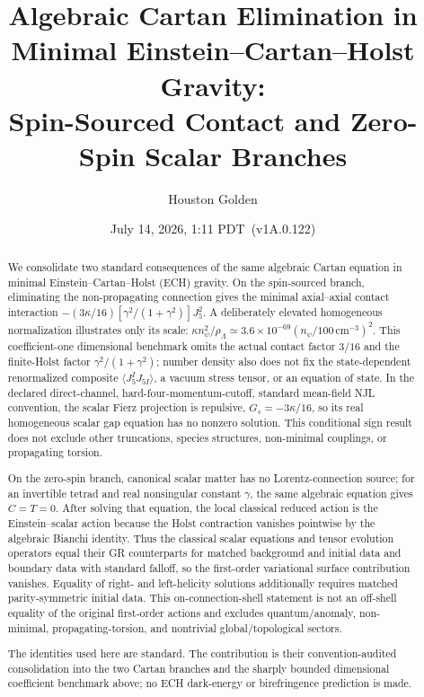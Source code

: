 \documentclass[aps,prd,twocolumn,superscriptaddress,preprintnumbers,nofootinbib,longbibliography,floatfix]{revtex4-2}
\newcommand{\paperVersion}{v1A.0.122}
\newcommand{\paperTimestamp}{July 14, 2026, 1:11 PDT}
\begin{document}

\title{Algebraic Cartan Elimination in Minimal Einstein--Cartan--Holst Gravity:\\
Spin-Sourced Contact and Zero-Spin Scalar Branches}

\author{Houston Golden}

\date{\paperTimestamp\ (\paperVersion)}

\begin{abstract}
We consolidate two standard consequences of the same algebraic Cartan
equation in minimal Einstein--Cartan--Holst (ECH) gravity.  On the
spin-sourced branch, eliminating the non-propagating connection gives the
minimal axial--axial contact interaction
$-(3\kappa/16)[\gamma^2/(1+\gamma^2)]J_5^2$.  A deliberately elevated
homogeneous normalization illustrates only its scale:
$\kappa n_\psi^2/\rho_\Lambda\simeq
3.6\times10^{-69}(n_\psi/100\,\mathrm{cm}^{-3})^2$.
This coefficient-one dimensional benchmark omits the actual contact factor
$3/16$ and the finite-Holst factor $\gamma^2/(1+\gamma^2)$; number density
also does not fix the state-dependent renormalized composite
$\langle J_5^I J_{5I}\rangle$, a vacuum stress tensor, or an equation of
state.  In the declared direct-channel, hard-four-momentum-cutoff, standard
mean-field NJL convention, the scalar Fierz projection is repulsive,
$G_s=-3\kappa/16$, so its real homogeneous scalar gap equation has no nonzero
solution.  This conditional sign result does not exclude other truncations,
species structures, non-minimal couplings, or propagating torsion.

On the zero-spin branch, canonical scalar matter has no Lorentz-connection
source; for an invertible tetrad and real nonsingular constant $\gamma$, the
same algebraic equation gives $C=T=0$.  After solving that equation, the local
classical reduced action is the Einstein--scalar action because the Holst
contraction vanishes pointwise by the algebraic Bianchi identity.  Thus the
classical scalar equations and tensor evolution operators equal their GR
counterparts for matched background and initial data and boundary data with
standard falloff, so the first-order variational surface contribution
vanishes.  Equality of right- and left-helicity solutions additionally
requires matched parity-symmetric initial data.  This on-connection-shell
statement is not an off-shell equality
of the original first-order actions and excludes quantum/anomaly,
non-minimal, propagating-torsion, and nontrivial global/topological sectors.

The identities used here are standard.  The contribution is their
convention-audited consolidation into the two Cartan branches and the sharply
bounded dimensional coefficient benchmark above; no ECH dark-energy or
birefringence prediction is made.
\end{abstract}
\end{document}
